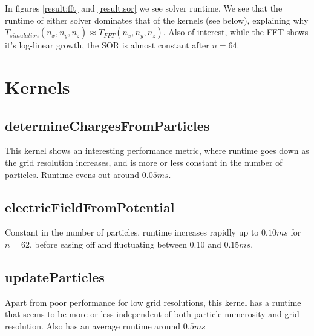 In figures \ref{result:fft} and \ref{result:sor} we see solver runtime. We see that the runtime of either solver dominates
that of the kernels (see below), explaining why $T_{simulation}(n_x, n_y, n_z) \approx T_{FFT}(n_x, n_y, n_z)$. Also of
interest, while the FFT shows it's log-linear growth, the SOR is almost constant after $n=64$.

\section{Kernels}
\subsection{determineChargesFromParticles}
This kernel shows an interesting performance metric, where runtime goes down as the grid resolution increases, and is
more or less constant in the number of particles. Runtime evens out around $0.05ms$.

\subsection{electricFieldFromPotential}
Constant in the number of particles, runtime increases rapidly up to $0.10ms$ for $n=62$, before easing off and fluctuating between 0.10 and $0.15ms$.

\subsection{updateParticles}
Apart from poor performance for low grid resolutions, this kernel has a runtime that seems to be more or less independent
of both particle numerosity and grid resolution. Also has an average runtime around $0.5ms$
